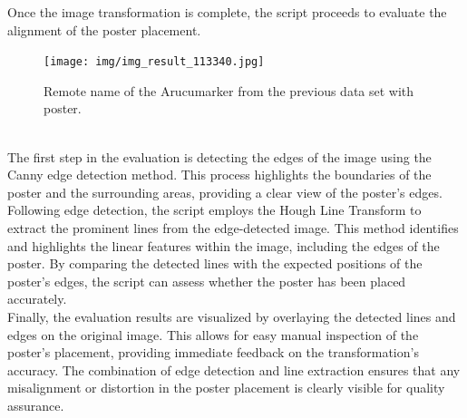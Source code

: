 \documentclass[a4paper,twocolumn]{article}
\begin{document}
Once the image transformation is complete, the script proceeds to evaluate the alignment of the poster placement.
\begin{figure}[htbp]
    \centering
    \texttt{[image: img/img\_result\_113340.jpg]} %
    \caption{Remote name of the Arucumarker from the previous data set with poster.}
    \label{fig:example-result}
\end{figure}
 \\
 The first step in the evaluation is detecting the edges of the image using the Canny edge detection method. This process highlights the boundaries of the poster and the surrounding areas, providing a clear view of the poster's edges.
Following edge detection, the script employs the Hough Line Transform to extract the prominent lines from the edge-detected image. This method identifies and highlights the linear features within the image, including the edges of the poster. By comparing the detected lines with the expected positions of the poster's edges, the script can assess whether the poster has been placed accurately.
\\
Finally, the evaluation results are visualized by overlaying the detected lines and edges on the original image. This allows for easy manual inspection of the poster’s placement, providing immediate feedback on the transformation’s accuracy. The combination of edge detection and line extraction ensures that any misalignment or distortion in the poster placement is clearly visible for quality assurance.
\end{document}

